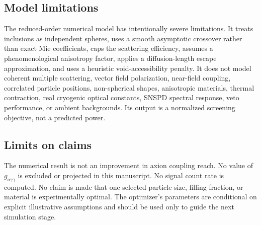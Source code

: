 \documentclass[10.5pt,a4paper]{article}
\begin{document}
\subsection{Model limitations}
The reduced-order numerical model has intentionally severe limitations. It treats inclusions as independent spheres, uses a smooth asymptotic crossover rather than exact Mie coefficients, caps the scattering efficiency, assumes a phenomenological anisotropy factor, applies a diffusion-length escape approximation, and uses a heuristic void-accessibility penalty. It does not model coherent multiple scattering, vector field polarization, near-field coupling, correlated particle positions, non-spherical shapes, anisotropic materials, thermal contraction, real cryogenic optical constants, SNSPD spectral response, veto performance, or ambient backgrounds. Its output is a normalized screening objective, not a predicted power.

\subsection{Limits on claims}
The numerical result is not an improvement in axion coupling reach. No value of $g_{a\gamma\gamma}$ is excluded or projected in this manuscript. No signal count rate is computed. No claim is made that one selected particle size, filling fraction, or material is experimentally optimal. The optimizer's parameters are conditional on explicit illustrative assumptions and should be used only to guide the next simulation stage.
\end{document}
